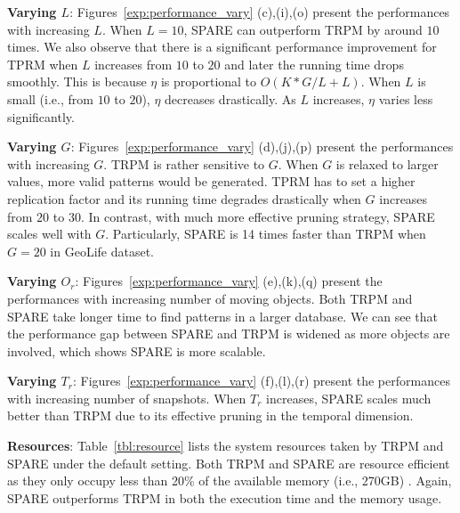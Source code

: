 \textbf{Varying $L$}: Figures~\ref{exp:performance_vary} (c),(i),(o) present the performances with increasing $L$. When $L=10$, SPARE can outperform TRPM by around $10$ times. We also observe that there is a significant performance improvement for TPRM when $L$ increases from $10$ to $20$ and later the running time drops smoothly. 
This is because $\eta$ is proportional to $O(K*G/L+L)$. When $L$ is small (i.e., from $10$ to $20$),
$\eta$ decreases drastically. As $L$ increases, $\eta$ varies less significantly.

\textbf{Varying $G$}: Figures~\ref{exp:performance_vary} (d),(j),(p) present the performances with increasing $G$.  TRPM is rather sensitive to $G$. When $G$ is relaxed to larger values, more valid patterns would be generated. TPRM has to set a higher replication factor and its running time degrades drastically when $G$ increases from $20$ to $30$. In contrast, with much more effective pruning strategy, SPARE scales well with $G$. Particularly, SPARE is 14 times faster than TRPM when $G=20$ in GeoLife dataset.

\textbf{Varying $O_r$}: Figures~\ref{exp:performance_vary} (e),(k),(q) present the performances with increasing number of moving objects. Both TRPM and SPARE take longer time to find patterns in a larger database. We can see that the performance gap between SPARE and TRPM is widened as more objects are involved, which shows SPARE is more scalable.

\textbf{Varying $T_r$}: Figures~\ref{exp:performance_vary} (f),(l),(r) present 
the performances with increasing number of snapshots. When $T_r$ increases, SPARE scales much better than TRPM due to its effective pruning in the temporal dimension. 


\textbf{Resources}: Table~\ref{tbl:resource} lists the system resources taken 
by TRPM and SPARE under the default setting. Both TRPM and SPARE are 
resource efficient as they only occupy less than 20\% 
of the available memory (i.e., 270GB) . Again, SPARE outperforms TRPM in both the execution time and the memory usage.


